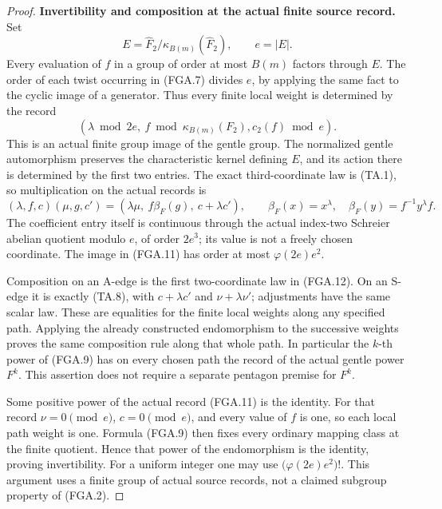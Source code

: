 \begin{proof}
\par\medskip\noindent\textbf{Invertibility and composition at the actual finite source record.}\quad
Set
\[
 E=\widehat F_2/\kappa_{B(m)}(\widehat F_2),\qquad e=|E|.
                                                               \tag{FGA.10}
\]
Every evaluation of $f$ in a group of order at most
$B(m)$ factors through $E$.  The order of each
twist occurring in (FGA.7) divides $e$, by applying
the same fact to the cyclic image of a generator.
Thus every finite local weight is determined by
the record
\[
             (\lambda\bmod2e,\ f\bmod\kappa_{B(m)}(F_2),
                                      c_2(f)\bmod e).
                                                               \tag{FGA.11}
\]
This is an actual finite group image of the gentle
group.  The normalized gentle automorphism preserves
the characteristic kernel defining $E$, and its
action there is determined by the first two entries.
The exact third-coordinate law is (TA.1), so
multiplication on the actual records is
\[
  (\lambda,f,c)(\mu,g,c')
       =(\lambda\mu,\ f\beta_F(g),\ c+\lambda c'),
 \qquad
 \beta_F(x)=x^\lambda,\quad\beta_F(y)=f^{-1}y^\lambda f.
                                                               \tag{FGA.12}
\]
The coefficient entry itself is continuous through
the actual index-two Schreier abelian quotient
modulo $e$, of order $2e^3$; its value is not a
freely chosen coordinate.  The image in (FGA.11)
has order at most $\varphi(2e)e^2$.

Composition on an A-edge is the first two-coordinate
law in (FGA.12).  On an S-edge it is exactly
(TA.8), with $c+\lambda c'$ and
$\nu+\lambda\nu'$; adjustments have the same scalar
law.  These are equalities for the finite local
weights along any specified path.  Applying the
already constructed endomorphism to the successive
weights proves the same composition rule along
that whole path.  In particular the $k$-th power
of (FGA.9) has on every chosen path the record of
the actual gentle power $F^k$.  This assertion does
not require a separate pentagon premise for $F^k$.

Some positive power of the actual record (FGA.11)
is the identity.  For that record $\nu=0\pmod e$,
$c=0\pmod e$, and every value of $f$ is one, so
each local path weight is one.  Formula (FGA.9)
then fixes every ordinary mapping class at the
finite quotient.  Hence that power of the
endomorphism is the identity, proving invertibility.
For a uniform integer one may use
$\bigl(\varphi(2e)e^2\bigr)!$.
This argument uses a finite group of actual source
records, not a claimed subgroup property of (FGA.2).


\end{proof}
